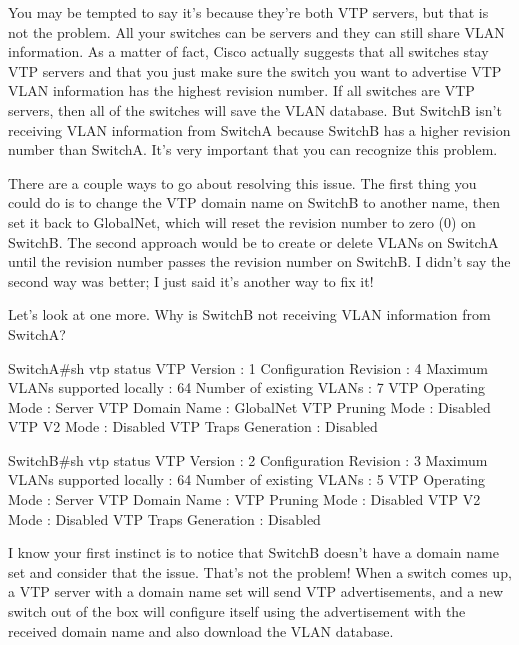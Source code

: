 You may be tempted to say it's because they're both VTP servers, but
that is not the problem. All your switches can be servers and they can
still share VLAN information. As a matter of fact, Cisco actually
suggests that all switches stay VTP servers and that you just make sure
the switch you want
to advertise VTP VLAN information has the highest revision number. If
all switches are VTP servers, then all of the switches will save the
VLAN database. But SwitchB isn't receiving VLAN information from SwitchA
because SwitchB has a higher revision number than SwitchA. It's very
important that you can recognize this problem.

There are a couple ways to go about resolving this issue. The first
thing you could do is to change the VTP domain name on SwitchB to
another name, then set it back to GlobalNet, which will reset the
revision number to zero (0) on SwitchB. The second approach would be to
create or delete VLANs on SwitchA until the revision number passes the
revision number on SwitchB. I didn't say the second way was better; I
just said it's another way to fix it!

Let's look at one more. Why is SwitchB not receiving VLAN information
from SwitchA?

\begin{cli}
SwitchA#sh vtp status
VTP Version                     : 1
Configuration Revision          : 4
Maximum VLANs supported locally : 64
Number of existing VLANs        : 7
VTP Operating Mode              : Server
VTP Domain Name                 : GlobalNet
VTP Pruning Mode                : Disabled
VTP V2 Mode                     : Disabled
VTP Traps Generation            : Disabled
 
SwitchB#sh vtp status
VTP Version                     : 2
Configuration Revision          : 3
Maximum VLANs supported locally : 64
Number of existing VLANs        : 5
VTP Operating Mode              : Server
VTP Domain Name                 :
VTP Pruning Mode                : Disabled
VTP V2 Mode                     : Disabled
VTP Traps Generation            : Disabled
\end{cli}

I know your first instinct is to notice that SwitchB doesn't have a
domain name set and consider that the issue. That's not the problem!
When a switch comes up, a VTP server with a domain name set will send
VTP advertisements, and a new switch out of the box will configure
itself using the advertisement with the received domain name and also
download the VLAN database.

